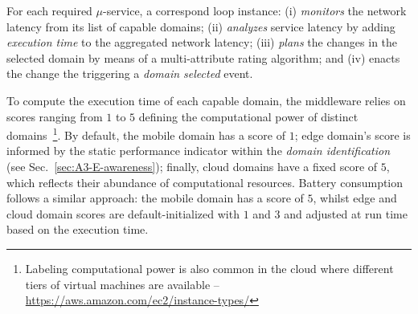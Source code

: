 
For each required $\mu$-service, a correspond loop instance: (i) \textit{monitors} the network latency from its list of capable domains; (ii) \textit{analyzes} service latency by adding \textit{execution time} to the aggregated network latency;  (iii) \textit{plans} the changes in the selected domain by means of a multi-attribute rating algorithm; and (iv) enacts the change the triggering a \textit{domain selected} event.



To compute the execution time of each capable domain, the middleware relies on scores ranging from $1$ to $5$ defining the computational power of distinct domains~\footnote{Labeling computational power is also common in the cloud where different tiers of virtual machines are available -- \url{https://aws.amazon.com/ec2/instance-types/}}. By default, the mobile domain has a score of $1$; edge domain's score is informed by the static performance indicator within the \textit{domain identification} (see Sec.~\ref{sec:A3-E-awareness}); finally, cloud domains have a fixed score of $5$, which reflects their abundance of computational resources. Battery consumption follows a similar approach: the mobile domain has a score of $5$, whilst edge and cloud domain scores are default-initialized with $1$ and $3$ and adjusted at run time based on the execution time.



